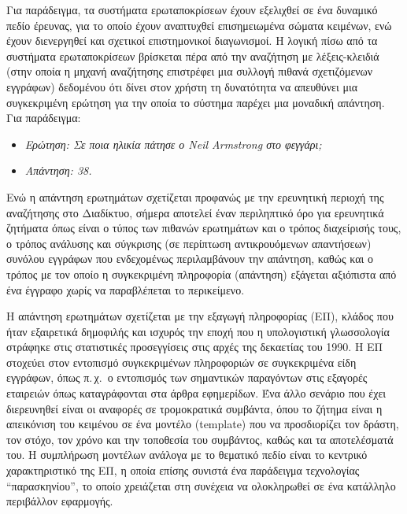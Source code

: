 \documentclass[]{../../metanetpaper}
\begin{document}
\begin{multicols}{2}

Για παράδειγμα, τα συστήματα ερωταποκρίσεων έχουν εξελιχθεί σε ένα δυναμικό πεδίο έρευνας, για το οποίο έχουν αναπτυχθεί επισημειωμένα σώματα κειμένων, ενώ έχουν διενεργηθεί και σχετικοί επιστημονικοί διαγωνισμοί. Η λογική πίσω από τα συστήματα ερωταποκρίσεων βρίσκεται πέρα από την αναζήτηση με λέξεις-κλειδιά (στην οποία η μηχανή αναζήτησης επιστρέφει μια συλλογή πιθανά σχετιζόμενων εγγράφων) δεδομένου ότι δίνει στον χρήστη τη δυνατότητα να απευθύνει μια συγκεκριμένη ερώτηση για την οποία το σύστημα παρέχει μια μοναδική απάντηση. Για παράδειγμα:

\begin{itemize}
\item[] \textit{Ερώτηση: Σε ποια ηλικία πάτησε ο Neil Armstrong στο φεγγάρι;}
\item[] \textit{Απάντηση: 38.}
\end{itemize}

Ενώ η απάντηση ερωτημάτων σχετίζεται προφανώς με την ερευνητική περιοχή της αναζήτησης στο Διαδίκτυο, σήμερα αποτελεί έναν περιληπτικό όρο για ερευνητικά ζητήματα όπως είναι ο τύπος των πιθανών ερωτημάτων και ο τρόπος διαχείρισής τους, ο τρόπος ανάλυσης και σύγκρισης (σε περίπτωση αντικρουόμενων απαντήσεων) συνόλου εγγράφων που ενδεχομένως περιλαμβάνουν την απάντηση, καθώς και ο τρόπος με τον οποίο η συγκεκριμένη πληροφορία (απάντηση) εξάγεται αξιόπιστα από ένα έγγραφο χωρίς να παραβλέπεται το περικείμενο. 

Η απάντηση ερωτημάτων σχετίζεται με την εξαγωγή πληροφορίας (ΕΠ), κλάδος που ήταν εξαιρετικά δημοφιλής και ισχυρός την εποχή που η υπολογιστική γλωσσολογία στράφηκε στις στατιστικές προσεγγίσεις στις αρχές της δεκαετίας του 1990. Η ΕΠ στοχεύει στον εντοπισμό συγκεκριμένων πληροφοριών σε συγκεκριμένα είδη εγγράφων, όπως π.\,χ.~ο εντοπισμός των σημαντικών παραγόντων  στις εξαγορές εταιρειών όπως καταγράφονται στα άρθρα εφημερίδων. Ένα άλλο σενάριο που έχει διερευνηθεί είναι οι αναφορές σε τρομοκρατικά συμβάντα, όπου το ζήτημα είναι η απεικόνιση του κειμένου σε ένα μοντέλο (template) που να προσδιορίζει τον δράστη, τον στόχο, τον χρόνο και την τοποθεσία του συμβάντος, καθώς και τα αποτελέσματά του. Η συμπλήρωση μοντέλων ανάλογα με το θεματικό πεδίο είναι το κεντρικό χαρακτηριστικό της EΠ, η οποία επίσης συνιστά ένα παράδειγμα τεχνολογίας ``παρασκηνίου'', το οποίο χρειάζεται στη συνέχεια να ολοκληρωθεί σε ένα κατάλληλο περιβάλλον εφαρμογής. 


\end{multicols}
\end{document}
